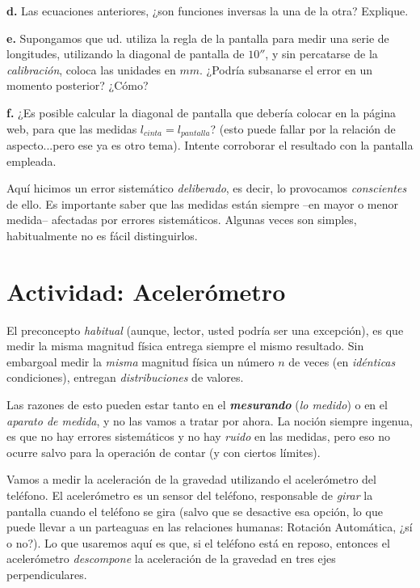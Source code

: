 \documentclass[10pt,a4paper]{article}
\numberwithin{equation}{section}%
\numberwithin{equation}{subsection}
\begin{document}
\noindent \textbf{d.} Las ecuaciones anteriores, ¿son funciones inversas la una de la otra? Explique.

\noindent \textbf{e.} Supongamos que ud. utiliza la regla de la pantalla para medir una serie de longitudes, utilizando la diagonal de pantalla de $10''$, y sin percatarse de la \textit{calibración}, coloca las unidades en $mm$. ¿Podría subsanarse el error en un momento posterior? ¿Cómo?

\noindent \textbf{f.} ¿Es posible calcular la diagonal de pantalla que debería colocar en la página web, para que las medidas $l_{cinta} = l_{pantalla}$? (esto puede fallar por la relación de aspecto...pero ese ya es otro tema). Intente corroborar el resultado con la pantalla empleada.

Aquí hicimos un error sistemático \textit{deliberado}, es decir, lo provocamos \textit{conscientes} de ello. Es importante saber que las medidas están siempre --en mayor o menor medida-- afectadas por errores sistemáticos. Algunas veces son simples,  habitualmente no es fácil distinguirlos.

\section{Actividad: Acelerómetro}

El preconcepto \textit{habitual} (aunque, lector, usted podría ser una excepción), es que medir la misma magnitud física entrega siempre el mismo resultado. Sin embargoal medir la \textit{misma} magnitud física un número $n$ de veces (en \textit{idénticas} condiciones), entregan \textit{distribuciones} de valores.

Las razones de esto pueden estar tanto en el \textit{\textbf{mesurando}} (\textit{lo medido}) o en el \textit{aparato de medida}, y no las vamos a tratar por ahora. La noción siempre ingenua, es que no hay errores sistemáticos y no hay \textit{ruido} en las medidas, pero eso no ocurre salvo para la operación de contar (y con ciertos límites).

Vamos a medir la aceleración de la gravedad utilizando el acelerómetro del teléfono. El acelerómetro es un sensor del teléfono, responsable de \textit{girar} la pantalla cuando el teléfono se gira (salvo que se desactive esa opción, lo que puede llevar a un parteaguas en las relaciones humanas: Rotación Automática, ¿sí o no?). Lo que usaremos aquí es que, si el teléfono está en reposo, entonces el acelerómetro \textit{descompone} la aceleración de la gravedad en tres ejes perpendiculares.
\end{document}
